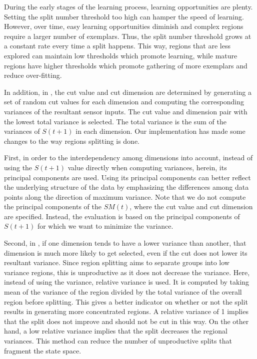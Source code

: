 During the early stages of the learning process, learning opportunities are plenty. Setting the split number threshold too high can hamper the speed of learning. However, over time, easy learning opportunities diminish and complex regions require a larger number of exemplars. Thus, the split number threshold grows at a constant rate every time a split happens. This way, regions that are less explored can maintain low thresholds which promote learning, while mature regions have higher thresholds which promote gathering of more exemplars and reduce over-fitting.

In addition, in \cite{Oudeyer2007}, the cut value and cut dimension are determined by generating a set of random cut values for each dimension and computing the corresponding variances of the resultant sensor inputs. The cut value and dimension pair with the lowest total variance is selected. The total variance is the sum of the variances of $S(t+1)$ in each dimension. Our implementation has made some changes to the way regions splitting is done.

First, in order to the interdependency among dimensions into account, instead of using the $S(t+1)$ value directly when computing variances, herein, its principal components are used. Using its principal components can better reflect the underlying structure of the data by emphasizing the differences among data points along the direction of maximum variance. Note that we do not compute the principal components of the $SM(t)$, where the cut value and cut dimension are specified. Instead, the evaluation is based on the principal components of $S(t+1)$ for which we want to minimize the variance. 

Second, in \cite{Oudeyer2007}, if one dimension tends to have a lower variance than another, that dimension is much more likely to get selected, even if the cut does not lower its resultant variance. Since region splitting aims to separate groups into low variance regions, this is unproductive as it does not decrease the variance. Here, instead of using the variance, relative variance is used. It is computed by taking mean of the variance of the region divided by the total variance of the overall region before splitting. This gives a better indicator on whether or not the split results in generating more concentrated regions. A relative variance of 1 implies that the split does not improve and should not be cut in this way. On the other hand, a low relative variance implies that the split decreases the regional variances. This method can reduce the number of unproductive splits that fragment the state space.

